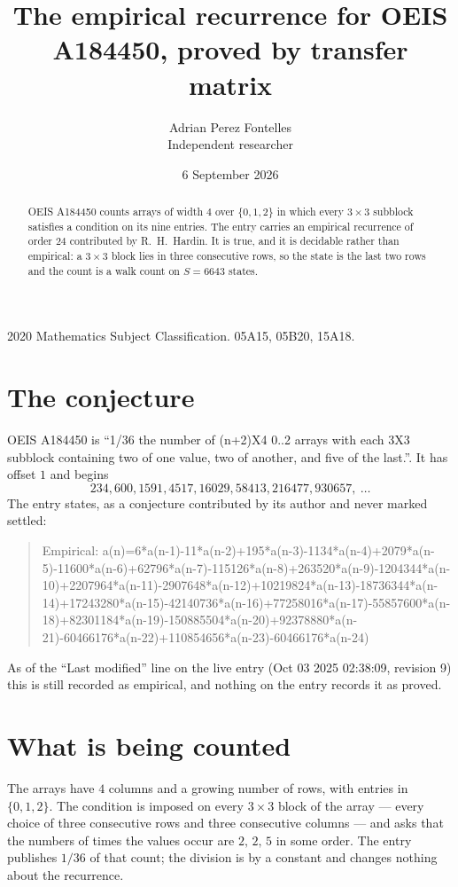 \documentclass[11pt,a4paper]{article}
\title{The empirical recurrence for OEIS A184450, proved by transfer matrix}
\author{Adrian Perez Fontelles\\ \small Independent researcher}
\date{6 September 2026}
\theoremstyle{plain}
\theoremstyle{definition}
\begin{document}
\maketitle

\begin{abstract}
OEIS A184450 counts arrays of width $4$ over $\{0,1,2\}$ in which every $3\times3$ subblock
satisfies a condition on its nine entries. The entry carries an empirical recurrence of order
$24$ contributed by R.~H.~Hardin. It is true, and it is decidable rather than empirical: a
$3\times3$ block lies in three consecutive rows, so the state is the last two rows and the
count is a walk count on $S=6643$ states.
\end{abstract}

\noindent\small 2020 Mathematics Subject Classification. 05A15, 05B20, 15A18.\normalsize

\section{The conjecture}

OEIS A184450 is ``1/36 the number of (n+2)X4 0..2 arrays with each 3X3 subblock containing two of one value, two of another, and five of the last.''. It has offset $1$ and begins
\[
234, 600, 1591, 4517, 16029, 58413, 216477, 930657,\ \dots
\]
The entry states, as a conjecture contributed by its author and never marked settled:
\begin{quote}
Empirical: a(n)=6*a(n-1)-11*a(n-2)+195*a(n-3)-1134*a(n-4)+2079*a(n-5)-11600*a(n-6)+62796*a(n-7)-115126*a(n-8)+263520*a(n-9)-1204344*a(n-10)+2207964*a(n-11)-2907648*a(n-12)+10219824*a(n-13)-18736344*a(n-14)+17243280*a(n-15)-42140736*a(n-16)+77258016*a(n-17)-55857600*a(n-18)+82301184*a(n-19)-150885504*a(n-20)+92378880*a(n-21)-60466176*a(n-22)+110854656*a(n-23)-60466176*a(n-24)
\end{quote}
As of the ``Last modified'' line on the live entry (Oct 03 2025 02:38:09, revision 9) this is still
recorded as empirical, and nothing on the entry records it as proved.

\section{What is being counted}

The arrays have $4$ columns and a growing number of rows, with entries in $\{0,1,2\}$. The
condition is imposed on every $3\times3$ block of the array --- every choice of three
consecutive rows and three consecutive columns --- and asks that the numbers of times the values occur are $2,\,2,\,5$ in some order. The entry publishes $1/36$ of that count; the division is by a constant and changes nothing about the recurrence.
\end{document}
